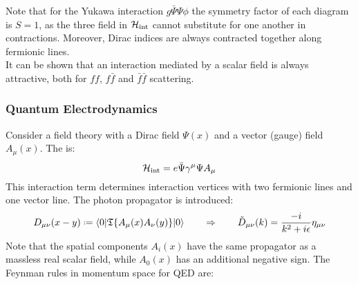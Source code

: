 Note that for the Yukawa interaction $ g \bar{\Psi} \Psi \phi $ the symmetry factor of each diagram is $ S = 1 $, as the three field in $ \mathcal{H}_\text{int} $ cannot substitute for one another in contractions. Moreover, Dirac indices are always contracted together along fermionic lines. \\
It can be shown that an interaction mediated by a scalar field is always attractive, both for $ ff $, $ f\bar{f} $ and $ \bar{f}\bar{f} $ scattering.

\subsubsection{Quantum Electrodynamics}
\label{sssec:qed-feyn}

Consider a field theory with a Dirac field $ \Psi(x) $ and a vector (gauge) field $ A_\mu(x) $. The  is:
\begin{equation}
  \mathcal{H}_\text{int} = e \bar{\Psi} \gamma^\mu \Psi A_\mu
\end{equation}
This interaction term determines interaction vertices with two fermionic lines and one vector line.
The photon propagator is introduced:
\begin{equation}
  D_{\mu \nu}(x-y) \defeq \braket{0 | \tempord\{A_\mu(x) A_\nu(y)\} | 0}
  \qquad \Rightarrow \qquad
  \tilde{D}_{\mu \nu}(k) = \frac{-i}{k^2 + i\epsilon} \eta_{\mu \nu}
  \label{eq:phot-prop}
\end{equation}
Note that the spatial components $ A_i(x) $ have the same propagator as a massless real scalar field, while $ A_0(x) $ has an additional negative sign.
The Feynman rules in momentum space for QED are:
